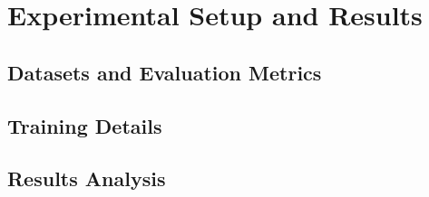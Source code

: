 \section{Experimental Setup and Results}

\subsection{Datasets and Evaluation Metrics}

\subsection{Training Details}

\subsection{Results Analysis}
